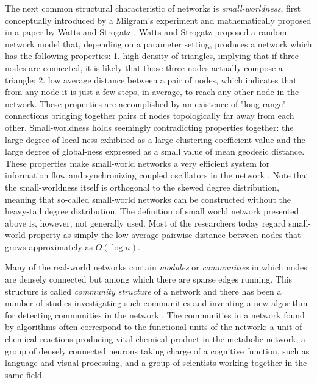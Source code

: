 \documentclass{article}
\begin{document}
	The next common structural characteristic of networks is \textit{small-worldness}, first conceptually introduced by a Milgram's experiment \cite{Milgram} and mathematically proposed in a paper by Watts and Strogatz \cite{watts1998cds}. Watts and Strogatz proposed a random network model that, depending on a parameter setting, produces a network which has the following properties: 1. high density of triangles, implying that if three nodes are connected, it is likely that those three nodes actually compose a triangle; 2. low average distance between a pair of nodes, which indicates that from any node it is just a few steps, in average, to reach any other node in the network. These properties are accomplished by an existence of "long-range" connections bridging together pairs of nodes topologically far away from each other. Small-worldness holds seemingly contradicting properties together: the large degree of local-ness exhibited as a large clustering coefficient value and the large degree of global-ness expressed as a small value of mean geodesic distance.  These properties make small-world networks a very efficient system for information flow \cite{SmallWorldEfficiency} and synchronizing coupled oscillators in the network \cite{SmallWorldSynchronization}. Note that the small-worldness itself is orthogonal to the skewed degree distribution, meaning that so-called small-world networks can be constructed without the heavy-tail degree distribution. The definition of small world network presented above is, however, not generally used. Most of the researchers today regard small-world property as simply the low average pairwise distance between nodes that grows approximately as $O(\log n)$.
	
	
	Many of the real-world networks contain \textit{modules} or \textit{communities} in which nodes are densely connected but among which there are sparse edges running. This structure is called \textit{community structure} of a network and there has been a number of studies investigating such communities and inventing a new algorithm for detecting communities in the network \cite{Modularity1, Modularity2, ModularityReview}. The communities in a network found by algorithms often correspond to the functional units of the network: a unit of chemical reactions producing vital chemical product in the metabolic network, a group of densely connected neurons taking charge of a cognitive function, such as language and visual processing, and a group of scientists working together in the same field.
	
	
	
\end{document}
